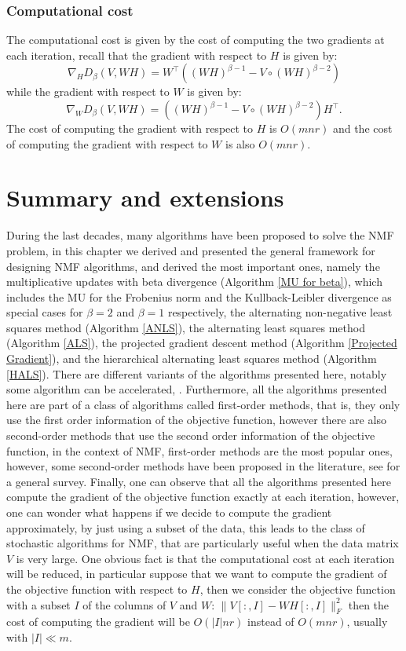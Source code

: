 \subsubsection{Computational cost}
The computational cost is given by the cost of computing the two gradients at each iteration, recall that the gradient with respect to \( H \) is given by:
\begin{equation}
    \nabla_H D_{\beta}(V, WH) = W^\top \left( (WH)^{\beta - 1} - V \circ (WH)^{\beta - 2} \right)
\end{equation}
while the gradient with respect to \( W \) is given by:
\begin{equation}
    \nabla_W D_{\beta}(V, WH) = \left( (WH)^{\beta - 1} - V \circ (WH)^{\beta - 2} \right) H^\top.
\end{equation}
The cost of computing the gradient with respect to \( H \) is $O(mnr)$ and the cost of computing the gradient with respect to \( W \) is also $O(mnr)$.
\section*{Summary and extensions}
During the last decades, many algorithms have been proposed to solve the NMF problem,  
in this chapter we derived and presented the general framework for designing NMF algorithms,
and derived the most important ones, namely the multiplicative updates with beta divergence (Algorithm \ref{MU for beta}), which includes the MU for the Frobenius norm and the Kullback-Leibler divergence as special cases for $\beta = 2$ and $\beta = 1$ respectively, the alternating non-negative least squares method (Algorithm \ref{ANLS}), the alternating least squares method (Algorithm \ref{ALS}), the projected gradient descent method (Algorithm \ref{Projected Gradient}), and the hierarchical alternating least squares method (Algorithm \ref{HALS}).
There are different variants of the algorithms presented here, notably some algorithm can be accelerated, \cite{gillis2012accelerated}.
Furthermore, all the algorithms presented here are part of a class of algorithms called first-order methods, that is, they only use the first order information of the objective function, however there are also second-order methods that use the second order information of the objective function, in the context of NMF, first-order methods are the most popular ones,
however, some second-order methods have been proposed in the literature, see \cite{huang2019low} for a general survey.
Finally, one can observe that all the algorithms presented here compute the gradient of the objective function exactly at each iteration, 
however, one can wonder what happens if we decide to compute the gradient approximately, by just using a subset of the data, this leads to the class of stochastic algorithms for NMF, that are particularly useful when the data matrix \( V \) is very large.
One obvious fact is that the computational cost at each iteration will be reduced, in particular suppose that we want to compute the gradient of the objective function with respect to $H$, then we consider the objective function with a subset $I$ of the columns of \( V \) and \( W \):
$\|V[:,I] - W H[:,I]\|_F^2$ then the cost of computing the gradient will be $O(|I|nr)$ instead of $O(mnr)$, usually with $|I| \ll m$.